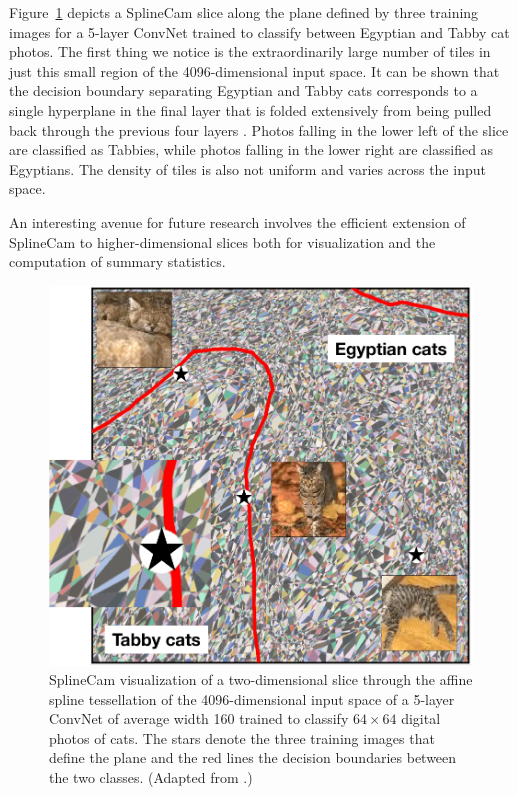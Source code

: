 \documentclass{notices}
\begin{document}
Figure~\ref{fig:cats} depicts a SplineCam slice along the plane defined by three training images for a 5-layer ConvNet trained to classify between Egyptian and Tabby cat photos.
The first thing we notice is the extraordinarily large number of tiles in just this small region of the 4096-dimensional input space.
It can be shown that the decision boundary separating Egyptian and Tabby cats corresponds to a single hyperplane in the final layer that is folded extensively from being pulled back through the previous four layers \cite{romain}.
Photos falling in the lower left of the slice are classified as Tabbies, while photos falling in the lower right are classified as Egyptians. 
The density of tiles is also not uniform and varies across the input space.

An interesting avenue for future research involves the efficient extension of SplineCam to higher-dimensional slices both for visualization and the computation of summary statistics.


\begin{figure}[h]
    \centering
\includegraphics[width=0.85\linewidth]{Figs/cats2.pdf}
    \caption{\small
    SplineCam visualization of a two-dimensional slice through the affine spline tessellation of the 4096-dimensional input space of a 5-layer ConvNet of average width 160 trained to classify $64 \times 64$ digital photos of cats. 
    The stars denote the three training images that define the plane and the red lines the decision boundaries between the two classes.
    (Adapted from \cite{splinecam}.)
}
    \label{fig:cats}
\end{figure}
\end{document}
